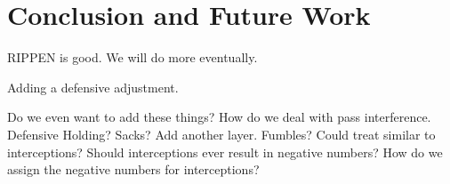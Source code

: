 \documentclass[aoas]{imsart}\usepackage[]{graphicx}\usepackage[]{color}
\begin{document}
\section{Conclusion and Future Work}
RIPPEN is good.  We will do more eventually.  

Adding a defensive adjustment.  


Do we even want to add these things?  
How do we deal with pass interference.  
Defensive Holding? 
Sacks? Add another layer.  
Fumbles? Could treat similar to interceptions? 
Should interceptions ever result in negative numbers?  
How do we assign the negative numbers for interceptions?  










\end{document}
